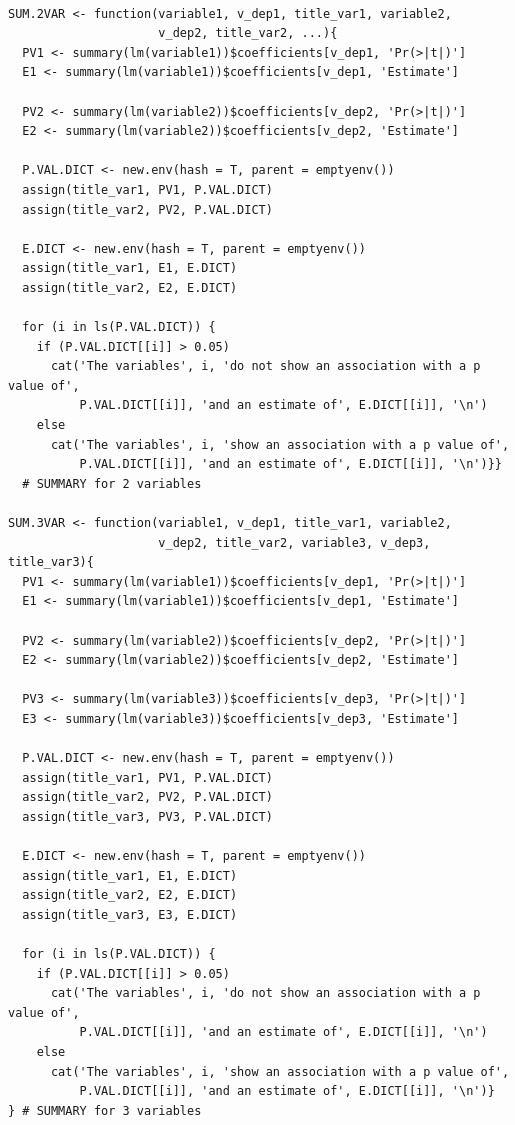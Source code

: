 \documentclass{article}
\begin{document}
\begin{lstlisting}

SUM.2VAR <- function(variable1, v_dep1, title_var1, variable2, 
                     v_dep2, title_var2, ...){
  PV1 <- summary(lm(variable1))$coefficients[v_dep1, 'Pr(>|t|)']
  E1 <- summary(lm(variable1))$coefficients[v_dep1, 'Estimate']
  
  PV2 <- summary(lm(variable2))$coefficients[v_dep2, 'Pr(>|t|)']
  E2 <- summary(lm(variable2))$coefficients[v_dep2, 'Estimate']
  
  P.VAL.DICT <- new.env(hash = T, parent = emptyenv())
  assign(title_var1, PV1, P.VAL.DICT)
  assign(title_var2, PV2, P.VAL.DICT)
  
  E.DICT <- new.env(hash = T, parent = emptyenv())
  assign(title_var1, E1, E.DICT)
  assign(title_var2, E2, E.DICT)
  
  for (i in ls(P.VAL.DICT)) {
    if (P.VAL.DICT[[i]] > 0.05)
      cat('The variables', i, 'do not show an association with a p value of',  
          P.VAL.DICT[[i]], 'and an estimate of', E.DICT[[i]], '\n')
    else
      cat('The variables', i, 'show an association with a p value of',  
          P.VAL.DICT[[i]], 'and an estimate of', E.DICT[[i]], '\n')}} 
  # SUMMARY for 2 variables

SUM.3VAR <- function(variable1, v_dep1, title_var1, variable2, 
                     v_dep2, title_var2, variable3, v_dep3, title_var3){
  PV1 <- summary(lm(variable1))$coefficients[v_dep1, 'Pr(>|t|)']
  E1 <- summary(lm(variable1))$coefficients[v_dep1, 'Estimate']
  
  PV2 <- summary(lm(variable2))$coefficients[v_dep2, 'Pr(>|t|)']
  E2 <- summary(lm(variable2))$coefficients[v_dep2, 'Estimate']
  
  PV3 <- summary(lm(variable3))$coefficients[v_dep3, 'Pr(>|t|)']
  E3 <- summary(lm(variable3))$coefficients[v_dep3, 'Estimate']
  
  P.VAL.DICT <- new.env(hash = T, parent = emptyenv())
  assign(title_var1, PV1, P.VAL.DICT)
  assign(title_var2, PV2, P.VAL.DICT)
  assign(title_var3, PV3, P.VAL.DICT)
  
  E.DICT <- new.env(hash = T, parent = emptyenv())
  assign(title_var1, E1, E.DICT)
  assign(title_var2, E2, E.DICT)
  assign(title_var3, E3, E.DICT)
  
  for (i in ls(P.VAL.DICT)) {
    if (P.VAL.DICT[[i]] > 0.05)
      cat('The variables', i, 'do not show an association with a p value of',  
          P.VAL.DICT[[i]], 'and an estimate of', E.DICT[[i]], '\n')
    else
      cat('The variables', i, 'show an association with a p value of',  
          P.VAL.DICT[[i]], 'and an estimate of', E.DICT[[i]], '\n')}
} # SUMMARY for 3 variables


\end{lstlisting}
\end{document}
